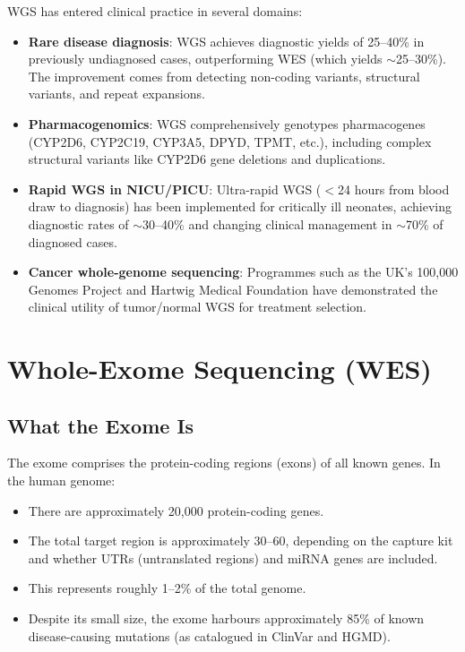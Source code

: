 WGS has entered clinical practice in several domains:

\begin{itemize}[nosep]
  \item \textbf{Rare disease diagnosis}: WGS achieves diagnostic yields of 25--40\% in previously undiagnosed cases, outperforming WES (which yields $\sim$25--30\%). The improvement comes from detecting non-coding variants, structural variants, and repeat expansions.
  \item \textbf{Pharmacogenomics}: WGS comprehensively genotypes pharmacogenes (CYP2D6, CYP2C19, CYP3A5, DPYD, TPMT, etc.), including complex structural variants like CYP2D6 gene deletions and duplications.
  \item \textbf{Rapid WGS in NICU/PICU}: Ultra-rapid WGS ($<$24 hours from blood draw to diagnosis) has been implemented for critically ill neonates, achieving diagnostic rates of $\sim$30--40\% and changing clinical management in $\sim$70\% of diagnosed cases.
  \item \textbf{Cancer whole-genome sequencing}: Programmes such as the UK's 100,000 Genomes Project and Hartwig Medical Foundation have demonstrated the clinical utility of tumor/normal WGS for treatment selection.
\end{itemize}

\section{Whole-Exome Sequencing (WES)}
\label{sec:wes}

\subsection{What the Exome Is}

The exome comprises the protein-coding regions (exons) of all known genes. In the human genome:

\begin{itemize}[nosep]
  \item There are approximately 20,000 protein-coding genes.
  \item The total target region is approximately 30--60\megabase{}, depending on the capture kit and whether UTRs (untranslated regions) and miRNA genes are included.
  \item This represents roughly 1--2\% of the total genome.
  \item Despite its small size, the exome harbours approximately 85\% of known disease-causing mutations (as catalogued in ClinVar and HGMD).
\end{itemize}

